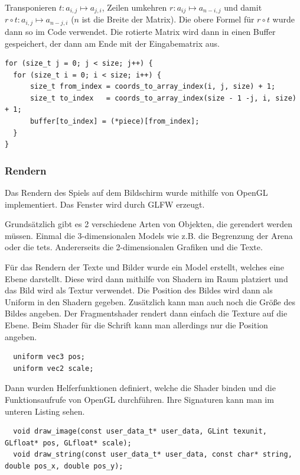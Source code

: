 \documentclass[11pt]{article}
\begin{document}
Transponieren $t: a_{i,j} \mapsto a_{j,i}$, Zeilen umkehren $r: a_{ij} \mapsto a_{n-i,j}$ und damit $r \circ t: a_{i,j} \mapsto a_{n-j,i}$ ($n$ ist die Breite der Matrix).
Die obere Formel für $r \circ t$ wurde dann so im Code verwendet.
Die rotierte Matrix wird dann in einen Buffer gespeichert, der dann am Ende mit der Eingabematrix aus.
\begin{lstlisting}
for (size_t j = 0; j < size; j++) {
  for (size_t i = 0; i < size; i++) {
      size_t from_index = coords_to_array_index(i, j, size) + 1;
      size_t to_index   = coords_to_array_index(size - 1 -j, i, size) + 1;
      buffer[to_index] = (*piece)[from_index];
  }
}
\end{lstlisting}

\subsubsection{Rendern}

Das Rendern des Spiels auf dem Bildschirm wurde mithilfe von OpenGL implementiert. Das Fenster wird durch GLFW erzeugt.

Grundsätzlich gibt es 2 verschiedene Arten von Objekten, die gerendert werden müssen. Einmal die 3-dimensionalen Models wie z.B. die Begrenzung der Arena oder die \glspl{tet}. 
Andererseits die 2-dimensionalen Grafiken und die Texte.

Für das Rendern der Texte und Bilder wurde ein Model erstellt, welches eine Ebene darstellt. Diese wird dann mithilfe von Shadern im Raum platziert und das Bild wird als Textur verwendet.
Die Position des Bildes wird dann als Uniform in den Shadern gegeben. Zusätzlich kann man auch noch die Größe des Bildes angeben.
Der Fragmentshader rendert dann einfach die Texture auf die Ebene.
Beim Shader für die Schrift kann man allerdings nur die Position angeben.

\begin{lstlisting}
  uniform vec3 pos;
  uniform vec2 scale;
\end{lstlisting}
  
Dann wurden Helferfunktionen definiert, welche die Shader binden und die Funktionsaufrufe von OpenGL durchführen.
Ihre Signaturen kann man im unteren Listing sehen.

\begin{lstlisting}
  void draw_image(const user_data_t* user_data, GLint texunit, GLfloat* pos, GLfloat* scale);
  void draw_string(const user_data_t* user_data, const char* string, double pos_x, double pos_y);
\end{lstlisting}
\end{document}
